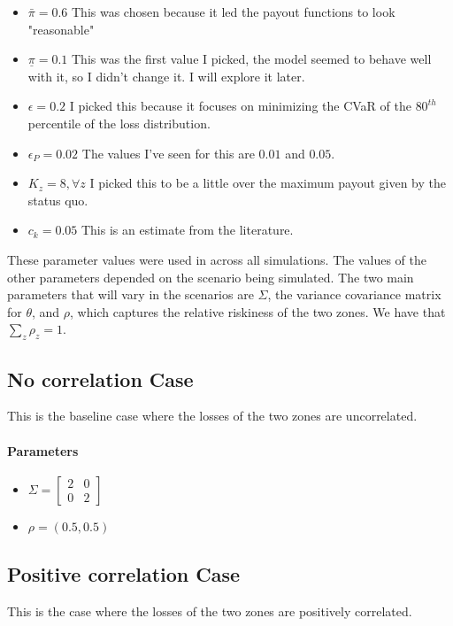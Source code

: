 \documentclass[11pt]{article}
\begin{document}
    \begin{itemize}
        \item $\bar{\pi}=0.6$ This was chosen because it led the payout functions to look "reasonable" 
        \item $\underline{\pi}=0.1$ This was the first value I picked, the model seemed to behave well with it, so I didn't change it. I will explore it later. 
        \item $\epsilon=0.2$ I picked this because it focuses on minimizing the CVaR of the $80^{th}$ percentile of the loss distribution.  
        \item $\epsilon_P=0.02$ The values I've seen for this are $0.01$ and $0.05$.
        \item $K_z = 8, \forall z$ I picked this to be a little over the maximum payout given by the status quo. 
        \item $c_k=0.05$ This is an estimate from the literature. 
    \end{itemize}

    These parameter values were used in across all simulations. The values of the other parameters depended on the scenario being simulated. The two main parameters that will vary in the scenarios are $\Sigma$, the variance covariance matrix for $\theta$, and $\rho$, which captures the relative riskiness of the two zones. We have that $\sum_z \rho_z = 1$. 

    \subsection*{No correlation Case}
    This is the baseline case where the losses of the two zones are uncorrelated. 
        \paragraph*{Parameters}
        \begin{itemize}
            \item $\Sigma = \begin{bmatrix}
                2 & 0 \\
                0 & 2 
                \end{bmatrix} $
            \item $\rho = (0.5,0.5)$
        \end{itemize}

    \subsection*{Positive correlation Case}
    This is the case where the losses of the two zones are positively correlated. 
\end{document}
